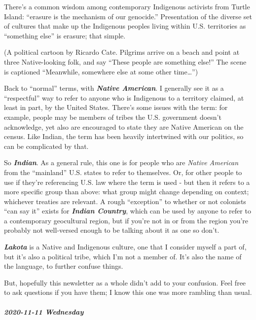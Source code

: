 \documentclass[11pt]{article}
\begin{document}
\begin{itemize}
There’s a common wisdom among contemporary Indigenous activists from Turtle Island: “erasure is the mechanism of our genocide.” Presentation of the diverse set of cultures that make up the Indigenous peoples living within U.S. territories as “something else” is erasure; that simple.

(A political cartoon by Ricardo Cate. Pilgrims arrive on a beach and point at three Native-looking folk, and say “These people are something else!” The scene is captioned “Meanwhile, somewhere else at some other time…”)

Back to “normal” terms, with \textbf{\emph{Native American}}. I generally see it as a “respectful” way to refer to anyone who is Indigenous to a territory claimed, at least in part, by the United States. There’s some issues with the term: for example, people may be members of tribes the U.S. government doesn’t acknowledge, yet also are encouraged to state they are Native American on the census. Like Indian, the term has been heavily intertwined with our politics, so can be complicated by that.

So \textbf{\emph{Indian}}. As a general rule, this one is for people who are \emph{Native American} from the “mainland” U.S. states to refer to themselves. Or, for other people to use if they’re referencing U.S. law where the term is used - but then it refers to a more specific group than above: what group might change depending on context; whichever treaties are relevant. A rough “exception” to whether or not colonists “can say it” exists for \textbf{\emph{Indian Country}}, which can be used by anyone to refer to a contemporary geocultural region, but if you’re not in or from the region you’re probably not well-versed enough to be talking about it as one so don’t.

\textbf{\emph{Lakota}} is a Native and Indigenous culture, one that I consider myself a part of, but it’s also a political tribe, which I’m not a member of. It’s also the name of the language, to further confuse things.

But, hopefully this newsletter as a whole didn’t add to your confusion. Feel free to ask questions if you have them; I know this one was more rambling than usual.
\end{itemize}
\subparagraph*{2020-11-11 Wednesday}
\label{sec:org09302df}
\end{document}
